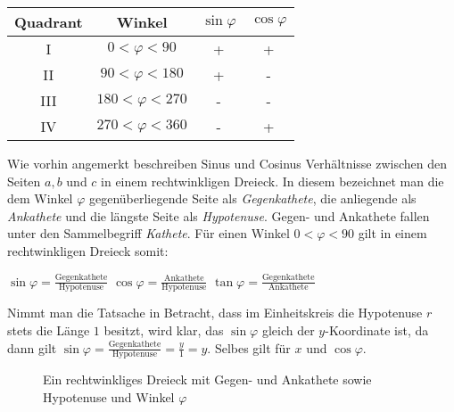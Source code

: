 \vspace{1cm}

\begin{table}[h!]
	\large
	\begin{tabular}{c | c | c | c}
		Quadrant & Winkel & $\sin \varphi$ & $\cos \varphi$
		\\ \hline
		I & $0 < \varphi < 90$ & + & +
		\\ 
		II & $90 < \varphi < 180$ & + & -
		\\
		III & $180 < \varphi < 270$ & - & -
		\\
		IV & $270 < \varphi < 360$ & - & +
		\\
	\end{tabular}
\end{table}

\pagebreak


Wie vorhin angemerkt beschreiben Sinus und Cosinus Verh\"{a}ltnisse zwischen den Seiten $a, b$ und $c$ in einem rechtwinkligen Dreieck. In diesem bezeichnet man die dem Winkel $\varphi$ gegen\"{u}berliegende Seite als \emph{Gegenkathete}, die anliegende als \emph{Ankathete} und die l\"{a}ngste Seite als \emph{Hypotenuse}. Gegen- und Ankathete fallen unter den Sammelbegriff \emph{Kathete}. F\"{u}r einen Winkel $0 < \varphi < 90$ gilt in einem rechtwinkligen Dreieck somit:

\begin{center}
$\sin \varphi = \frac{\text{Gegenkathete}}{\text{Hypotenuse}}$
\hspace{1cm}
$\cos \varphi = \frac{\text{Ankathete}}{\text{Hypotenuse}}$
\hspace{1cm}
$\tan \varphi = \frac{\text{Gegenkathete}}{\text{Ankathete}}$
\end{center}

Nimmt man die Tatsache in Betracht, dass im Einheitskreis die Hypotenuse $r$ stets die L\"{a}nge $1$ besitzt, wird klar, das $\sin \varphi$ gleich der $y$-Koordinate ist, da dann gilt $\sin \varphi = \frac{\text{Gegenkathete}}{\text{Hypotenuse}} = \frac{y}{1} = y$. Selbes gilt f\"{u}r $x$ und $\cos \varphi$.


\begin{figure}[h!]
	\caption*{Ein rechtwinkliges Dreieck mit Gegen- und Ankathete sowie Hypotenuse und Winkel $\varphi$}
\end{figure}

